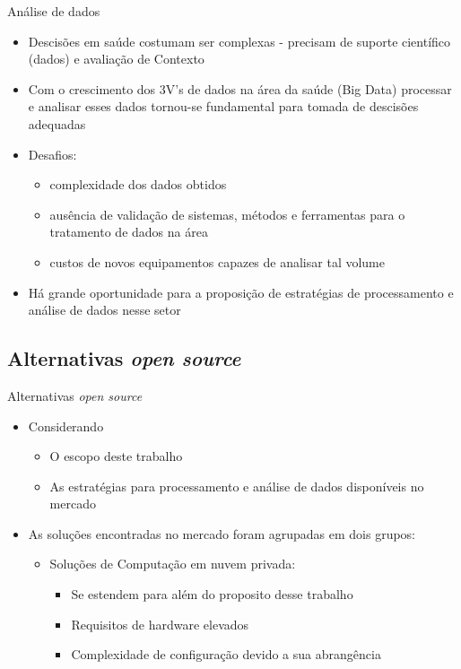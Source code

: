 \documentclass[10pt,brazil]{beamer}
\theoremstyle{definition}
\begin{document}
\begin{frame}{Análise de dados}
  \begin{itemize}
    \item Descisões em saúde costumam ser complexas - precisam de suporte científico (dados) e avaliação de Contexto
    \item Com o crescimento dos 3V's de dados na área da saúde (Big Data) processar e analisar esses dados tornou-se fundamental para tomada de descisões adequadas
    \item Desafios:
          \begin{itemize}
            \item complexidade dos dados obtidos
            \item ausência de validação de sistemas, métodos e ferramentas para o tratamento de dados na área
            \item custos de novos equipamentos capazes de analisar tal volume
          \end{itemize}
    \item Há grande oportunidade para a proposição de estratégias de processamento e análise de dados nesse setor
  \end{itemize}
\end{frame}

\subsection{Alternativas \emph{open source}}

\begin{frame}{Alternativas \emph{open source}}
  \begin{itemize}
    \item Considerando
          \begin{itemize}
            \item O escopo deste trabalho
            \item As estratégias para processamento e análise de dados disponíveis no mercado
          \end{itemize}
    \item [] As soluções encontradas no mercado foram agrupadas em dois grupos:
          \begin{itemize}
            \item Soluções de Computação em nuvem privada:
                  \begin{itemize}
                    \item Se estendem para além do proposito desse trabalho
                    \item Requisitos de hardware elevados
                    \item Complexidade de configuração devido a sua abrangência
                  \end{itemize}
          \end{itemize}
  \end{itemize}
\end{frame}
\end{document}
